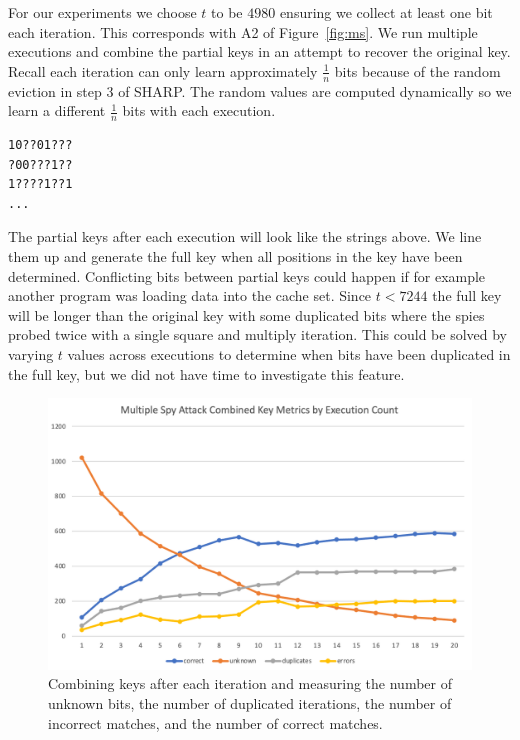 \documentclass[12pt]{article}
\begin{document}
For our experiments we choose $t$ to be $4980$ ensuring we collect at least one bit each iteration.
This corresponds with A2 of Figure~\ref{fig:ms}.
We run multiple executions and combine the partial keys in an attempt to recover the original key.
Recall each iteration can only learn approximately $\frac{1}{n}$ bits because of the random eviction in step $3$ of SHARP.
The random values are computed dynamically so we learn a different $\frac{1}{n}$ bits with each execution.

\begin{verbatim}
10??01???
?00???1??
1????1??1
...
\end{verbatim}

The partial keys after each execution will look like the strings above.
We line them up and generate the full key when all positions in the key have been determined.
Conflicting bits between partial keys could happen if for example another program was loading data into the cache set.
Since $t<7244$ the full key will be longer than the original key with some duplicated bits where the spies probed twice with a single square and multiply iteration.
This could be solved by varying $t$ values across executions to determine when bits have been duplicated in the full key, but we did not have time to investigate this feature.

\begin{figure}[h]
\centering
\includegraphics[scale=0.7]{../presentation/mult-spy-p.png}
\caption{Combining keys after each iteration and measuring the number of unknown bits, the number of duplicated iterations, the number of incorrect matches, and the number of correct matches.}
\label{fig:msp}
\end{figure}
\end{document}
